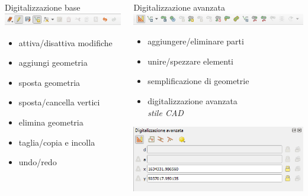 \documentclass{beamer}
\begin{document}
{\begin{frame}
    \begin{columns}
        \begin{column}{.45\textwidth}
            \begin{center}
                Digitalizzazione base \\
                \includegraphics[width=\textwidth] {pics/digit.png}
            \end{center}
            \begin{itemize}
        	 	\item attiva/disattiva modifiche
        	 	\item aggiungi geometria
        	 	\item sposta geometria
        	 	\item sposta/cancella vertici
        	 	\item elimina geometria
        	 	\item taglia/copia e incolla
        	 	\item undo/redo
        	 \end{itemize}
        \end{column}
        \begin{column}{.55\textwidth}
            \begin{center}
                Digitalizzazione avanzata \\
                \includegraphics[width=\textwidth] {pics/digit_avanzata_barra.png}
            \end{center}
            \begin{itemize}
        	 	\item aggiungere/eliminare parti
        	 	\item unire/spezzare elementi
        	 	\item semplificazione di geometrie
        	 	\item digitalizzazione avanzata\\ \emph{stile CAD}
    	 	\end{itemize}
    	 	\includegraphics[width=\textwidth] {pics/digit_avanzata.png}
        \end{column}
    \end{columns}


\end{frame}}
\end{document}
